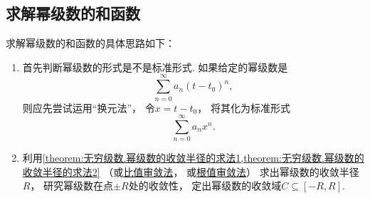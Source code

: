 \subsection*{求解幂级数的和函数}
求解幂级数的和函数的具体思路如下：
\begin{enumerate}
	\item 首先判断幂级数的形式是不是标准形式.
	如果给定的幂级数是\[
		\sum_{n=0}^\infty a_n (t-t_0)^n,
	\]
	则应先尝试运用“换元法”，
	令\(x=t-t_0\)，
	将其化为标准形式\[
		\sum_{n=0}^\infty a_n x^n.
	\]

	\item 利用\cref{theorem:无穷级数.幂级数的收敛半径的求法1,theorem:无穷级数.幂级数的收敛半径的求法2}%
	（或\hyperref[theorem:无穷级数.正项级数的比值审敛法]{比值审敛法}，
	或\hyperref[theorem:无穷级数.正项级数的根值审敛法]{根值审敛法}）%
	求出幂级数的收敛半径\(R\)，
	研究幂级数在点\(\pm R\)处的收敛性，
	定出幂级数的收敛域\(C\subseteq[-R,R]\).


\end{enumerate}
